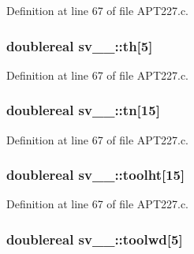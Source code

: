 Definition at line 67 of file A\+P\+T227.\+c.

\subsubsection[{\texorpdfstring{th}{th}}]{\setlength{\rightskip}{0pt plus 5cm}doublereal sv\+\_\+\_\+\+::th\mbox{[}5\mbox{]}}\hypertarget{structsv__1___aee84f3abb971d1e88a530581da9101cc}{}\label{structsv__1___aee84f3abb971d1e88a530581da9101cc}


Definition at line 67 of file A\+P\+T227.\+c.

\subsubsection[{\texorpdfstring{tn}{tn}}]{\setlength{\rightskip}{0pt plus 5cm}doublereal sv\+\_\+\_\+\+::tn\mbox{[}15\mbox{]}}\hypertarget{structsv__1___a5ea6302a312b311982a94b05ab3b6182}{}\label{structsv__1___a5ea6302a312b311982a94b05ab3b6182}


Definition at line 67 of file A\+P\+T227.\+c.

\subsubsection[{\texorpdfstring{toolht}{toolht}}]{\setlength{\rightskip}{0pt plus 5cm}doublereal sv\+\_\+\_\+\+::toolht\mbox{[}15\mbox{]}}\hypertarget{structsv__1___ae00b822916cd43183c17a6bffa1c9fba}{}\label{structsv__1___ae00b822916cd43183c17a6bffa1c9fba}


Definition at line 67 of file A\+P\+T227.\+c.

\subsubsection[{\texorpdfstring{toolwd}{toolwd}}]{\setlength{\rightskip}{0pt plus 5cm}doublereal sv\+\_\+\_\+\+::toolwd\mbox{[}5\mbox{]}}\hypertarget{structsv__1___a024ddffabd17331e827fd6e8bec9e363}{}\label{structsv__1___a024ddffabd17331e827fd6e8bec9e363}


